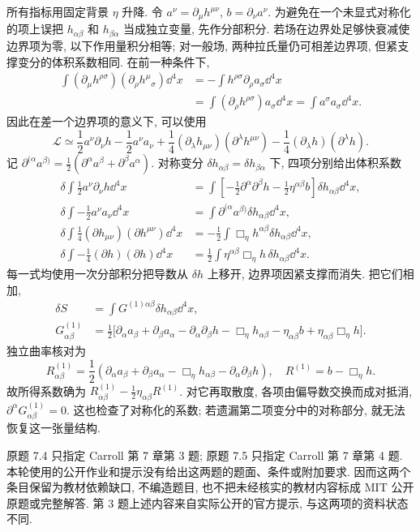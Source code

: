 \begin{solution}
所有指标用固定背景 $\eta$ 升降. 令 $a^\nu=\partial_\mu h^{\mu\nu}$, $b=\partial_\nu a^\nu$. 为避免在一个未显式对称化的项上误把 $h_{\alpha\beta}$ 和 $h_{\beta\alpha}$ 当成独立变量, 先作分部积分. 若场在边界处足够快衰减使边界项为零, 以下作用量积分相等; 对一般场, 两种拉氏量仍可相差边界项, 但紧支撑变分的体积系数相同. 在前一种条件下,
\begin{align*}
\int(\partial_\mu h^{\rho\sigma})(\partial_\rho h^\mu{}_{\sigma})\dd^4x
&=-\int h^{\rho\sigma}\partial_\rho a_\sigma\dd^4x\\
&=\int(\partial_\rho h^{\rho\sigma})a_\sigma\dd^4x
=\int a^\sigma a_\sigma\dd^4x.
\end{align*}
因此在差一个边界项的意义下, 可以使用
\[
\mathcal L\simeq\frac12a^\nu\partial_\nu h-\frac12a^\nu a_\nu
+\frac14(\partial_\lambda h_{\mu\nu})(\partial^\lambda h^{\mu\nu})
-\frac14(\partial_\lambda h)(\partial^\lambda h).
\]
记 $\partial^{(\alpha}a^{\beta)}=\tfrac12(\partial^\alpha a^\beta+\partial^\beta a^\alpha)$. 对称变分 $\delta h_{\alpha\beta}=\delta h_{\beta\alpha}$ 下, 四项分别给出体积系数
\begin{align*}
\delta\int\frac12a^\nu\partial_\nu h\dd^4x
&=\int\left[-\frac12\partial^\alpha\partial^\beta h
-\frac12\eta^{\alpha\beta}b\right]\delta h_{\alpha\beta}\dd^4x,\\
\delta\int-\frac12a^\nu a_\nu\dd^4x
&=\int\partial^{(\alpha}a^{\beta)}\delta h_{\alpha\beta}\dd^4x,\\
\delta\int\frac14(\partial h_{\mu\nu})(\partial h^{\mu\nu})\dd^4x
&=-\frac12\int\Box_\eta h^{\alpha\beta}\delta h_{\alpha\beta}\dd^4x,\\
\delta\int-\frac14(\partial h)(\partial h)\dd^4x
&=\frac12\int\eta^{\alpha\beta}\Box_\eta h\,\delta h_{\alpha\beta}\dd^4x.
\end{align*}
每一式均使用一次分部积分把导数从 $\delta h$ 上移开, 边界项因紧支撑而消失. 把它们相加,
\begin{align*}
\delta S&=\int G^{(1)\alpha\beta}\delta h_{\alpha\beta}\dd^4x,\\
G^{(1)}_{\alpha\beta}
&=\frac12\bigl[\partial_\alpha a_\beta+\partial_\beta a_\alpha
-\partial_\alpha\partial_\beta h-\Box_\eta h_{\alpha\beta}
-\eta_{\alpha\beta}b+\eta_{\alpha\beta}\Box_\eta h\bigr].
\end{align*}
独立曲率核对为
\[
R^{(1)}_{\alpha\beta}
=\frac12(\partial_\alpha a_\beta+\partial_\beta a_\alpha
-\Box_\eta h_{\alpha\beta}-\partial_\alpha\partial_\beta h),
\quad R^{(1)}=b-\Box_\eta h.
\]
故所得系数确为 $R^{(1)}_{\alpha\beta}-\tfrac12\eta_{\alpha\beta}R^{(1)}$. 对它再取散度, 各项由偏导数交换而成对抵消, $\partial^\alpha G^{(1)}_{\alpha\beta}=0$. 这也检查了对称化的系数; 若遗漏第二项变分中的对称部分, 就无法恢复这一张量结构.
\end{solution}

\begin{remark}
原题 7.4 只指定 Carroll 第 7 章第 3 题; 原题 7.5 只指定 Carroll 第 7 章第 4 题. 本轮使用的公开作业和提示没有给出这两题的题面、条件或附加要求. 因而这两个条目保留为教材依赖缺口, 不编造题目, 也不把未经核实的教材内容标成 MIT 公开原题或完整解答. 第 3 题上述内容来自实际公开的官方提示, 与这两项的资料状态不同.
\end{remark}
